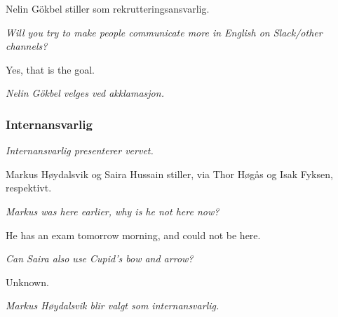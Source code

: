 \documentclass[10pt,norsk,a4paper]{article}
\begin{document}
\begin{minipage}[t]{0.49\textwidth}
Nelin Gökbel stiller som rekrutteringsansvarlig.

\emph{Will you try to make people communicate more in English on Slack/other channels?}

Yes, that is the goal.

\textit{Nelin Gökbel velges ved akklamasjon.}
\subsubsection{Internansvarlig}
\textit{Internansvarlig presenterer vervet.}

Markus Høydalsvik og Saira Hussain stiller, via Thor Høgås og Isak Fyksen, respektivt. 

\emph{Markus was here earlier, why is he not here now?}

He has an exam tomorrow morning, and could not be here.

\emph{Can Saira also use Cupid's bow and arrow?}

Unknown.

\textit{Markus Høydalsvik blir valgt som internansvarlig.}
\end{minipage}
\end{document}
